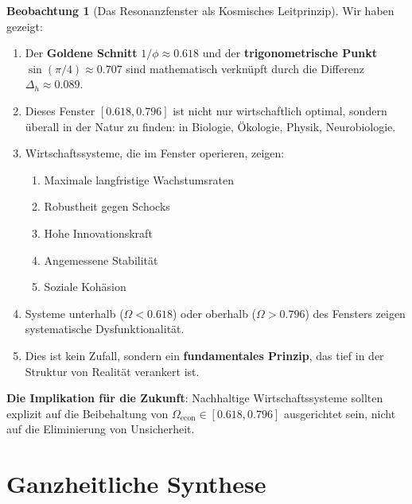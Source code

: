 \documentclass[a4paper, 12pt, twoside, openright]{report}
\theoremstyle{definition}
\newtheorem{beobachtung}{Beobachtung}
\theoremstyle{definition}
\begin{document}
\begin{beobachtung}[Das Resonanzfenster als Kosmisches Leitprinzip]

Wir haben gezeigt:

\begin{enumerate}
	\item Der \textbf{Goldene Schnitt} $1/\phi \approx 0.618$ und der \textbf{trigonometrische Punkt} $\sin(\pi/4) \approx 0.707$ sind mathematisch verknüpft durch die Differenz $\Delta_h \approx 0.089$.
	
	\item Dieses Fenster $[0.618, 0.796]$ ist nicht nur wirtschaftlich optimal, sondern überall in der Natur zu finden: in Biologie, Ökologie, Physik, Neurobiologie.
	
	\item Wirtschaftssysteme, die im Fenster operieren, zeigen:
	\begin{enumerate}
		\item Maximale langfristige Wachstumsraten
		\item Robustheit gegen Schocks
		\item Hohe Innovationskraft
		\item Angemessene Stabilität
		\item Soziale Kohäsion
	\end{enumerate}
	
	\item Systeme unterhalb ($\Omega < 0.618$) oder oberhalb ($\Omega > 0.796$) des Fensters zeigen systematische Dysfunktionalität.
	
	\item Dies ist kein Zufall, sondern ein \textbf{fundamentales Prinzip}, das tief in der Struktur von Realität verankert ist.
\end{enumerate}

\textbf{Die Implikation für die Zukunft}: Nachhaltige Wirtschaftssysteme sollten explizit auf die Beibehaltung von $\Omega_{\text{econ}} \in [0.618, 0.796]$ ausgerichtet sein, nicht auf die Eliminierung von Unsicherheit.

\end{beobachtung}

\cleardoublepage


\chapter{Ganzheitliche Synthese}
\label{ch:ganzheitliche-synthese}
\end{document}
